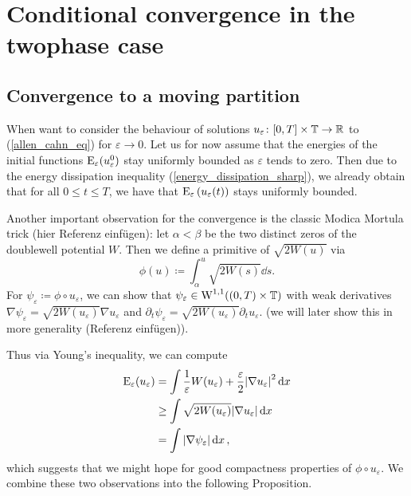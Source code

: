 \section{Conditional convergence in the twophase case}

\subsection{Convergence to a moving partition}

When want to consider the behaviour of solutions $ u_{ \varepsilon} \colon [0, T] \times \operatorname{\mathbb{T}} \to \mathbb{ R } $ to (\ref{allen_cahn_eq}) for $ \varepsilon \to 0 $. Let us for now assume that the energies of the initial functions $ \operatorname{E}_{ \varepsilon } ( u_{ \varepsilon }^{ 0 } ) $ stay uniformly bounded as $ \varepsilon $ tends to zero. 
Then due to the energy dissipation inequality (\ref{energy_dissipation_sharp}), we already obtain that for all
$ 0 \leq t \leq T $, we have that $ \operatorname{E}_{ \varepsilon } \left( u_{\varepsilon } ( t ) \right) $ stays uniformly  bounded.

Another important observation for the convergence is the classic Modica Mortula trick (hier Referenz einfügen): let $ \alpha < \beta $ be the two distinct zeros of the doublewell potential $ W $.
Then we define a primitive of $ \sqrt{ 2 W ( u ) } $ via
\begin{equation*}
	\phi ( u ) 
	\coloneqq
	\int_{ \alpha }^{ u }
	\sqrt{ 2 W ( s ) }
	\dd{ s }.
\end{equation*}
For $ \psi_{ \varepsilon } \coloneqq \phi \circ u_{ \varepsilon } $, we can show that $ \psi_{ \varepsilon } \in \operatorname{W}^{ 1, 1 } ( ( 0 , T ) \times \operatorname{\mathbb{T}} ) $ with weak derivatives $ \nabla \psi_{ \varepsilon } = \sqrt{ 2 W ( u_{ \varepsilon } ) } \nabla u_{ \varepsilon } $ and $ \partial_{ t } \psi_{ \varepsilon } = \sqrt{ 2 W ( u_{ \varepsilon } ) } \partial_{ t } u_{ \varepsilon } $. (we will later show this in more generality (Referenz einfügen)).

Thus via Young's inequality, we can compute
\begin{align}
	\operatorname{E}_{ \varepsilon } ( u_{ \varepsilon } )
	& =
	\int
	\frac{ 1 }{ \varepsilon }
	W ( u_{ \varepsilon } ) 
	+
	\frac{ \varepsilon }{ 2 }
	\abs{ \nabla u_{ \varepsilon } }^{ 2 }
	\dd{ x }
	\notag
	\\
	& \geq
	\int
	\sqrt{ 2 W ( u_{ \varepsilon } ) }
	\abs{ \nabla u_{ \varepsilon } }
	\dd{ x }
	\notag
	\\
	& =
	\int
	\abs{ \nabla \psi_{ \varepsilon} }
	\dd{ x }
	\label{modica_mortula_trick},
\end{align}
which suggests that we might hope for good compactness properties of $ \phi \circ u_{ \varepsilon } $.
We combine these two observations into the following Proposition.

